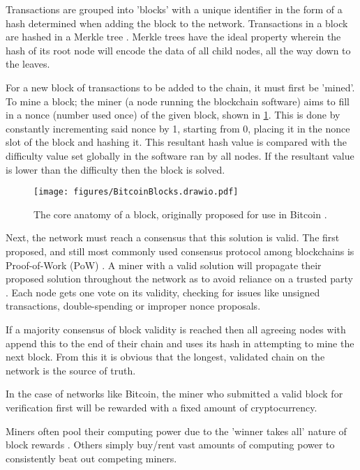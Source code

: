 \documentclass[10pt,journal,compsoc]{IEEEtran}
\begin{document}
Transactions are grouped into 'blocks' with a unique identifier in the form of a hash determined when adding the block to the network. Transactions in a block are hashed in a Merkle tree \cite{haber1997secure, massias1999design, merkle2019protocols}. Merkle trees have the ideal property wherein the hash of its root node will encode the data of all child nodes, all the way down to the leaves.

For a new block of transactions to be added to the chain, it must first be 'mined'. To mine a block; the miner (a node running the blockchain software) aims to fill in a nonce (number used once) of the given block, shown in \ref{fig:blockdiagram}. This is done by constantly incrementing said nonce by 1, starting from 0, placing it in the nonce slot of the block and hashing it. This resultant hash value is compared with the difficulty value set globally in the software ran by all nodes. If the resultant value is lower than the difficulty then the block is solved.

\begin{figure}[!h]
    \centering
    \texttt{[image: figures/BitcoinBlocks.drawio.pdf]}
    \caption{The core anatomy of a block, originally proposed for use in Bitcoin \cite{Nakamoto2008}.}
    \label{fig:blockdiagram}
\end{figure}

Next, the network must reach a consensus that this solution is valid. The first proposed, and still most commonly used consensus protocol among blockchains is Proof-of-Work (PoW) \cite{Gervais2016}. A miner with a valid solution will propagate their proposed solution throughout the network as to avoid reliance on a trusted party \cite{dai_1998}. Each node gets one vote on its validity, checking for issues like unsigned transactions, double-spending or improper nonce proposals.

If a majority consensus of block validity is reached then all agreeing nodes with append this to the end of their chain and uses its hash in attempting to mine the next block. From this it is obvious that the longest, validated chain on the network is the source of truth.

In the case of networks like Bitcoin, the miner who submitted a valid block for verification first will be rewarded with a fixed amount of cryptocurrency.

Miners often pool their computing power due to the 'winner takes all' nature of block rewards \cite{etherscan, ethermine}. Others simply buy/rent vast amounts of computing power to consistently beat out competing miners. 
\end{document}

